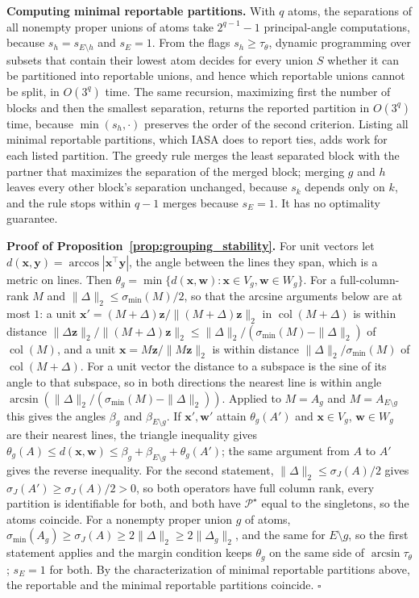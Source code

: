 \noindent\textbf{Computing minimal reportable partitions.}  With \(q\) atoms, the
separations of all nonempty proper unions of atoms take \(2^{q-1}-1\) principal-angle
computations, because \(s_h=s_{E\setminus h}\) and \(s_E=1\).  From the flags \(s_h\ge\tau_\theta\), dynamic
programming over subsets that contain their lowest atom decides for every union \(S\)
whether it can be partitioned into reportable unions, and hence which reportable unions
cannot be split, in \(O(3^q)\) time.  The same recursion, maximizing first the number
of blocks and then the smallest separation, returns the reported partition in
\(O(3^q)\) time, because \(\min(s_h,\cdot)\) preserves the order of the second criterion.
Listing all minimal reportable partitions, which IASA does to report ties, adds work for
each listed partition.  The greedy rule merges the least separated block with the
partner that maximizes the separation of the merged block; merging \(g\) and \(h\)
leaves every other block's separation unchanged, because \(s_k\) depends only on \(k\),
and the rule stops within \(q-1\) merges because \(s_E=1\).  It has no optimality
guarantee.

\noindent\textbf{Proof of Proposition~\ref{prop:grouping_stability}.}
For unit vectors let \(d(\mathbf x,\mathbf y)=\arccos|\mathbf x^\top\mathbf y|\),
the angle between the lines they span, which is a metric on lines.  Then
\(\theta_g=\min\{d(\mathbf x,\mathbf w):\mathbf x\in V_g,\mathbf w\in W_g\}\).
For a full-column-rank \(M\) and \(\|\Delta\|_2\le\sigma_{\min}(M)/2\), so that the
arcsine arguments below are at most \(1\): a unit
\(\mathbf x'=(M+\Delta)\mathbf z/\|(M+\Delta)\mathbf z\|_2\) in
\(\operatorname{col}(M+\Delta)\) is within distance
\(\|\Delta\mathbf z\|_2/\|(M+\Delta)\mathbf z\|_2\le
\|\Delta\|_2/(\sigma_{\min}(M)-\|\Delta\|_2)\) of \(\operatorname{col}(M)\), and a unit
\(\mathbf x=M\mathbf z/\|M\mathbf z\|_2\) is within distance
\(\|\Delta\|_2/\sigma_{\min}(M)\) of \(\operatorname{col}(M+\Delta)\).  For a unit
vector the distance to a subspace is the sine of its angle to that subspace, so in
both directions the nearest line is within angle
\(\arcsin(\|\Delta\|_2/(\sigma_{\min}(M)-\|\Delta\|_2))\).  Applied to \(M=A_g\) and
\(M=A_{E\setminus g}\) this gives the angles \(\beta_g\) and \(\beta_{E\setminus g}\).  If
\(\mathbf x',\mathbf w'\) attain \(\theta_g(A')\) and \(\mathbf x\in V_g\),
\(\mathbf w\in W_g\) are their nearest lines, the triangle inequality gives
\(\theta_g(A)\le d(\mathbf x,\mathbf w)\le\beta_g+\beta_{E\setminus g}+\theta_g(A')\); the same argument
from \(A\) to \(A'\) gives the reverse inequality.  For the second statement, \(\|\Delta\|_2\le\sigma_J(A)/2\) gives
\(\sigma_J(A')\ge\sigma_J(A)/2>0\), so both operators have full column rank, every
partition is identifiable for both, and both have \(\mathcal P^\star\) equal to the
singletons, so the atoms coincide.  For a nonempty proper union \(g\) of atoms,
\(\sigma_{\min}(A_g)\ge\sigma_J(A)\ge2\|\Delta\|_2\ge2\|\Delta_g\|_2\), and the same for
\(E\setminus g\), so the first statement applies and the margin condition keeps
\(\theta_g\) on the same side of \(\arcsin\tau_\theta\); \(s_E=1\) for both.  By the
characterization of minimal reportable partitions above, the reportable and the minimal
reportable partitions coincide.  \(\square\)
